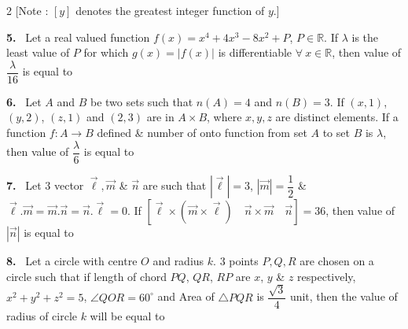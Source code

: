\documentclass[10pt]{extarticle}
\newcommand{\qn}[1]{\par\smallskip\noindent\textbf{#1.}~}
\begin{document}
\begin{multicols}{2}
[Note : $[y]$ denotes the greatest integer function of $y$.]
\qn{5} Let a real valued function $f(x)=x^4+4x^3-8x^2+P$, $P\in\mathbb R$. If $\lambda$ is the least value of $P$ for which $g(x)=|f(x)|$ is differentiable $\forall\ x\in\mathbb R$, then value of $\dfrac\lambda{16}$ is equal to
\qn{6} Let $A$ and $B$ be two sets such that $n(A)=4$ and $n(B)=3$. If $(x,1)$, $(y,2)$, $(z,1)$ and $(2,3)$ are in $A\times B$, where $x,y,z$ are distinct elements. If a function $f:A\to B$ defined \& number of onto function from set $A$ to set $B$ is $\lambda$, then value of $\dfrac\lambda6$ is equal to
\qn{7} Let $3$ vector $\vec\ell,\vec m$ \& $\vec n$ are such that $\left|\vec\ell\right|=3$, $|\vec m|=\dfrac12$ \& $\vec\ell.\vec m=\vec m.\vec n=\vec n.\vec\ell=0$. If $\left[\vec\ell\times\left(\vec m\times\vec\ell\right)\quad\vec n\times\vec m\quad\vec n\right]=36$, then value of $|\vec n|$ is equal to
\qn{8} Let a circle with centre $O$ and radius $k$. $3$ points $P,Q,R$ are chosen on a circle such that if length of chord $PQ$, $QR$, $RP$ are $x$, $y$ \& $z$ respectively, $x^2+y^2+z^2=5$, $\angle QOR=60^\circ$ and Area of $\triangle PQR$ is $\dfrac{\sqrt3}4$ unit, then the value of radius of circle $k$ will be equal to
\end{multicols}
\end{document}
